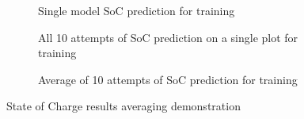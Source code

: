 \begin{figure*}[htbp]
  \centering
  \begin{subfigure}[b]{0.325\textwidth}
      \centering
      
      \caption{Single model SoC prediction for training \ \ \ \ \ }
      \label{subfig:Model-DEMO2-1}
  \end{subfigure}
  \hfill
  \begin{subfigure}[b]{0.325\textwidth}
      \centering
      
      \caption{All 10 attempts of SoC prediction on a single plot for training}
      \label{subfig:Model-DEMO2-10}
  \end{subfigure}
  \hfill
  \begin{subfigure}[b]{0.325\textwidth}
      \centering
      
      \caption{Average of 10 attempts of SoC prediction for training}
      \label{subfig:Model-DEMO2-avr}
  \end{subfigure}
  \caption{State of Charge results averaging demonstration}
  \label{fig:Model-DEMO2}
\end{figure*}